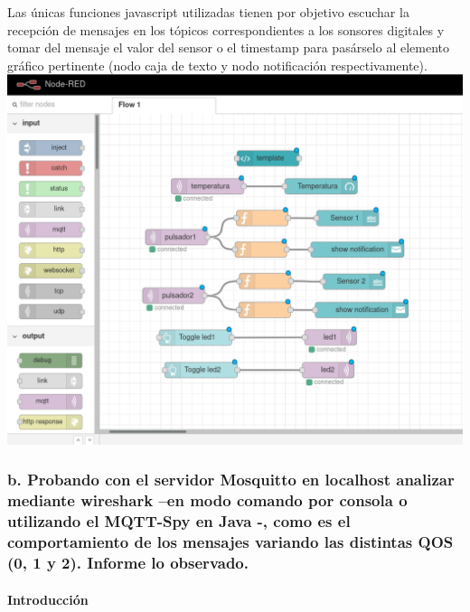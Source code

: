 \documentclass[11pt]{extarticle}
\begin{document}
Las únicas funciones javascript utilizadas tienen por objetivo escuchar
la recepción de mensajes en los tópicos correspondientes a los sonsores
digitales y tomar del mensaje el valor del sensor o el timestamp para
pasárselo al elemento gráfico pertinente (nodo caja de texto y nodo
notificación respectivamente).\\

    \includegraphics{images/node-red-panel-control.png}\\

    \hypertarget{b.-probando-con-el-servidor-mosquitto-en-localhost-analizar-mediante-wireshark-en-modo-comando-por-consola-o-utilizando-el-mqtt-spy-en-java---como-es-el-comportamiento-de-los-mensajes-variando-las-distintas-qos-0-1-y-2.-informe-lo-observado.}{%
\subsubsection{b. Probando con el servidor Mosquitto en localhost
analizar mediante wireshark --en modo comando por consola o utilizando
el MQTT-Spy en Java -, como es el comportamiento de los mensajes
variando las distintas QOS (0, 1 y 2). Informe lo
observado.}\label{b.-probando-con-el-servidor-mosquitto-en-localhost-analizar-mediante-wireshark-en-modo-comando-por-consola-o-utilizando-el-mqtt-spy-en-java---como-es-el-comportamiento-de-los-mensajes-variando-las-distintas-qos-0-1-y-2.-informe-lo-observado.}}

    \hypertarget{introducciuxf3n}{%
\paragraph{Introducción}\label{introducciuxf3n}}
\end{document}
